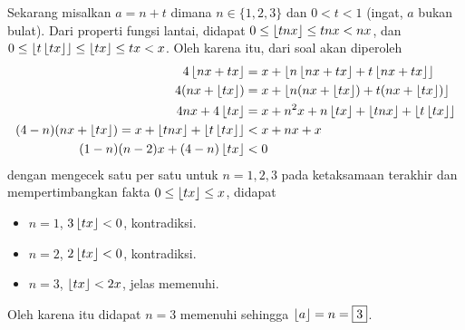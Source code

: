 \documentclass[12pt]{scrartcl}
\begin{document}
    Sekarang misalkan $a = n + t$ dimana $n \in \{1,2,3\}$ dan $0 < t < 1$ (ingat, $a$ bukan bulat). Dari properti fungsi lantai, didapat $0 \le \left\lfloor tnx \right\rfloor \le tnx < nx$, dan $0 \le \left\lfloor t\left\lfloor tx \right\rfloor \right\rfloor \le \left\lfloor tx \right\rfloor \le tx < x$. Oleh karena itu, dari soal akan diperoleh
    \begin{align*}
        4\left\lfloor nx+tx \right\rfloor &= x + \left\lfloor n\left\lfloor nx+tx \right\rfloor+t\left\lfloor nx+tx \right\rfloor \right\rfloor\\
        4(nx+\left\lfloor tx \right\rfloor) &= x + \left\lfloor n(nx+\left\lfloor tx \right\rfloor)+t(nx+\left\lfloor tx \right\rfloor) \right\rfloor\\
        4nx + 4\left\lfloor tx \right\rfloor &= x + n^2x + n\left\lfloor tx \right\rfloor + \left\lfloor tnx \right\rfloor + \left\lfloor t\left\lfloor tx \right\rfloor \right\rfloor\\
        (4-n)(nx+\left\lfloor tx \right\rfloor) = x + \left\lfloor tnx \right\rfloor + \left\lfloor t\left\lfloor tx \right\rfloor \right\rfloor&<x+nx+x\\
        (1-n)(n-2)x+(4-n)\left\lfloor tx \right\rfloor&<0
    \end{align*}
    dengan mengecek satu per satu untuk $n=1,2,3$ pada ketaksamaan terakhir dan mempertimbangkan fakta $0 \le \left\lfloor tx \right\rfloor \le x$, didapat
    \begin{itemize}
        \item $n=1$, $3\left\lfloor tx \right\rfloor < 0$, kontradiksi.
        \item $n=2$, $2\left\lfloor tx \right\rfloor < 0$, kontradiksi.
        \item $n=3$, $\left\lfloor tx \right\rfloor < 2x$, jelas memenuhi.
    \end{itemize}
    Oleh karena itu didapat $n=3$ memenuhi sehingga $\left\lfloor a \right\rfloor = n = \boxed{3}$.
\end{document}
